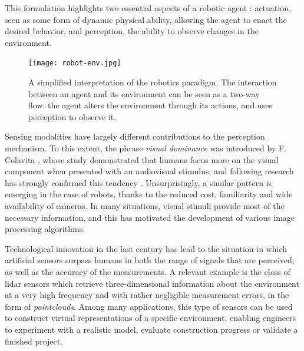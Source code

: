 This formulation highlights two essential aspects of a robotic agent : actuation, seen as some form of dynamic physical ability, allowing the agent to enact the desired behavior, and perception, the ability to observe changes in the environment.


\begin{figure}[H]
    \centering
    \texttt{[image: robot-env.jpg]}
    \caption[Perception in the Robot-Environment exchange]{A simplified interpretation of the robotics paradigm. The interaction between an agent and its environment can be seen as a two-way flow: the agent alters the environment through its actions, and uses perception to observe it.}
    \label{fig:robot-env}
\end{figure}


Sensing modalities have largely different contributions to the perception mechanism. To this extent, the phrase \emph{visual dominance} was introduced by F. Colavita \cite{colavita1974human}, whose study demonstrated that humans focus more on the visual component when presented with an audiovisual stimulus, and following research has strongly confirmed this tendency \cite{Hutmacher2019} \cite{hecht2009sensory}. Unsurprisingly, a similar pattern is emerging in the case of robots, thanks to the reduced cost, familiarity and wide availability of cameras. In many situations, visual stimuli provide most of the necessary information, and this has motivated the development of various image processing algorithms.

Technological innovation in the last century has lead to the situation in which artificial sensors surpass humans in both the range of signals that are perceived, as well as the accuracy of the measurements. A relevant example is the class of \acrfull{lidar} sensors which retrieve three-dimensional information about the environment at a very high frequency and with rather negligible measurement errors, in the form of \emph{\glspl{pointcloud}}. Among many applications, this type of sensors can be used to construct virtual representations of a specific environment, enabling engineers to experiment with a realistic model, evaluate construction progress or validate a finished project.

